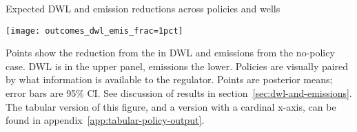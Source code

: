\caption{Expected \gls{DWL} and emission reductions across policies and wells}

\label{fig:policy-outcomes-1pct}
\begin{center}
\texttt{[image: outcomes\_dwl\_emis\_frac=1pct]}
\end{center}
Points show the reduction from the in \gls{DWL} and emissions from the no-policy case.
\gls{DWL} is in the upper panel, emissions the lower.
Policies are visually paired by what information is available to the regulator.
Points are posterior means; error bars are 95\% \gls{CI}.
See discussion of results in section~\ref{sec:dwl-and-emissions}.
The tabular version of this figure, and a version with a cardinal x-axis, can be found in appendix~\ref{app:tabular-policy-output}.
